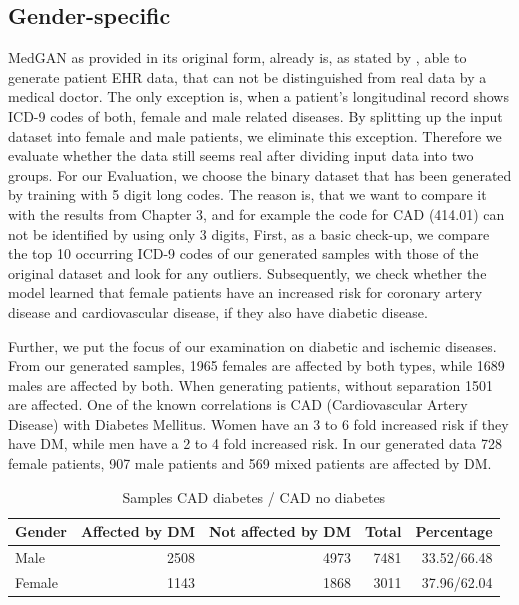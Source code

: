 \documentclass[11pt, a4paper, oneside]{book}
\begin{document}
\subsection{Gender-specific}
MedGAN as provided in its original form, already is, as stated by \citep{Choi2017}, able to generate patient EHR data, that can not be distinguished from real data by a medical doctor. The only exception is, when a patient's longitudinal record shows ICD-9 codes of both, female and male related diseases.  \citep{Choi2017}
By splitting up the input dataset into female and male patients, we eliminate this exception. Therefore we evaluate whether the data still seems real after dividing input data into two groups. For our Evaluation, we choose the binary dataset that has been generated by training with 5 digit long codes. The reason is, that we want to compare it with the results from Chapter 3, and for example the code for CAD (414.01) can not be identified by using only 3 digits,
First, as a basic check-up, we compare the top 10 occurring ICD-9 codes of our generated samples with those of the original dataset and look for any outliers. Subsequently, we check whether the model learned that female patients have an increased risk for coronary artery disease and cardiovascular disease, if they also have diabetic disease. 

Further, we put the focus of our examination on diabetic and ischemic diseases. 
From our generated samples, 1965 females are affected by both types, while 1689 males are affected by both. When generating patients, without separation 1501 are affected.
One of the known correlations is CAD (Cardiovascular Artery Disease) with Diabetes Mellitus. Women have an 3 to 6 fold increased risk if they have DM, while men have a 2 to 4 fold increased risk. \citep{juutilainen2004gender}
In our generated data 728 female patients, 907 male patients and 569 mixed patients are affected by DM.

\begin{table}
\begin{tabularx}{\textwidth}{X|r|r|r|r}
Gender & Affected by DM & Not affected by DM & Total & Percentage\\
\hline
Male 	& 2508 & 4973 & 7481 & 33.52/66.48\\
Female & 1143 & 1868 & 3011 & 37.96/62.04\\
\end{tabularx}
\caption{\label{tab:cad-diabetic-synth}Samples CAD diabetes / CAD no diabetes}
\end{table}
\end{document}
